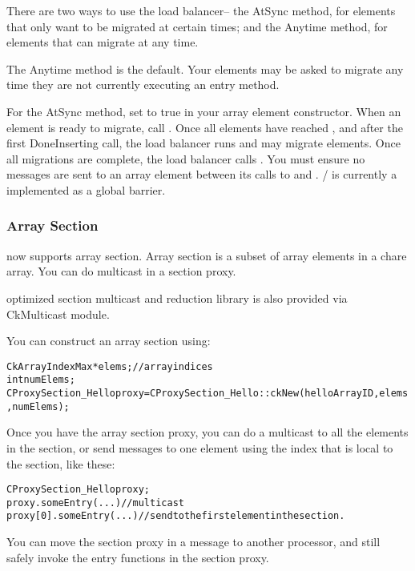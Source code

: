 There are two ways to use the load balancer-- the AtSync
method, for elements that only want to be migrated at certain
times; and the Anytime method, for elements that can migrate
at any time.

The Anytime method is the default.  Your elements may be
asked to migrate any time they are not currently executing
an entry method.

For the AtSync method, set  to true in your 
array element constructor.  When an element is ready to migrate,
call .  Once all elements have reached , 
and after the first DoneInserting call,
the load balancer runs and may migrate elements.  Once
all migrations are complete, the load balancer calls 
.  You must ensure no messages are
sent to an array element between its calls to  and
. / is currently
a implemented as a global barrier.


\subsubsection{Array Section}

\charmpp{} now supports array section. Array section is a subset of array 
elements in a chare array. You can do multicast in a section proxy.

optimized section multicast and reduction library is also provided via 
CkMulticast module. 

You can construct an array section using:

\begin{alltt}
  CkArrayIndexMax *elems;    // array indices
  int numElems;
  CProxySection_Hello proxy = CProxySection_Hello::ckNew(helloArrayID, elems, numElems);
\end{alltt}

Once you have the array section proxy, you can do a multicast to all the 
elements in the section, or send messages to one element using the index that
is local to the section, like these:

\begin{alltt}
  CProxySection_Hello proxy;
  proxy.someEntry(...)          // multicast
  proxy[0].someEntry(...)       // send to the first element in the section.
\end{alltt}

You can move the section proxy in a message to another processor, and still 
safely invoke the entry functions in the section proxy.

